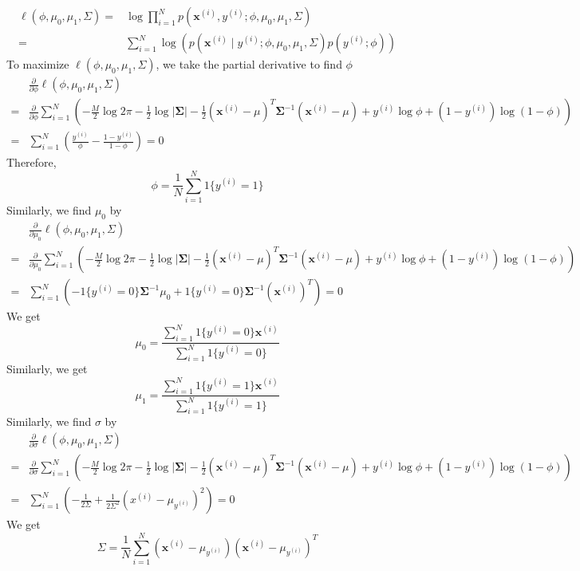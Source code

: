 \documentclass{article}
\begin{document}
$$
\begin{aligned}
\ell(\phi, \mu_{0}, \mu_{1}, \Sigma) 
= & \log \prod_{i=1}^{N} p(\mathbf{x}^{(i)}, y^{(i)} ; \phi, \mu_{0}, \mu_{1}, \Sigma) \\
= & \sum_{i=1}^{N} \log (p(\mathbf{x}^{(i)} \mid y^{(i)} ; \phi, \mu_{0}, \mu_{1}, \Sigma) p(y^{(i)} ; \phi))
\end{aligned}
$$
To maximize $\ell(\phi, \mu_{0}, \mu_{1}, \Sigma)$, we take the partial derivative to find $\phi$
$$
\begin{aligned}
& \frac{\partial}{\partial \phi} \ell(\phi, \mu_{0}, \mu_{1}, \Sigma) \\
=& \frac{\partial}{\partial \phi} \sum_{i=1}^{N}(-\frac{M}{2} \log 2 \pi-\frac{1}{2} \log |\boldsymbol{\Sigma}|-\frac{1}{2}(\mathbf{x}^{(i)}-\mu)^{T} \mathbf{\Sigma}^{-1}(\mathbf{x}^{(i)}-\mu)+y^{(i)} \log \phi+(1-y^{(i)}) \log (1-\phi)) \\
=& \sum_{i=1}^{N}(\frac{y^{(i)}}{\phi}-\frac{1-y^{(i)}}{1-\phi})=0
\end{aligned}
$$
Therefore,
$$
\phi = \frac{1}{N} \sum_{i=1}^{N} 1\{y^{(i)} = 1\}
$$
Similarly, we find $\mu_0$ by 
$$
\begin{aligned}
& \frac{\partial}{\partial \mu_{0}} \ell(\phi, \mu_{0}, \mu_{1}, \Sigma) \\
=& \frac{\partial}{\partial \mu_{0}} \sum_{i=1}^{N}(-\frac{M}{2} \log 2 \pi-\frac{1}{2} \log |\boldsymbol{\Sigma}|-\frac{1}{2}(\mathbf{x}^{(i)}-\mu)^{T} \mathbf{\Sigma}^{-1}(\mathbf{x}^{(i)}-\mu)+y^{(i)} \log \phi+(1-y^{(i)}) \log (1-\phi)) \\
=& \sum_{i=1}^{N}(-1\{y^{(i)}=0\} \boldsymbol{\Sigma}^{-1} \mu_{0}+1\{y^{(i)}=0\}\mathbf{\Sigma}^{-1}(\mathbf{x}^{(i)})^{T} )=0
\end{aligned}
$$
We get
$$
\mu_{0}=\frac{\sum_{i=1}^{N} 1\{y^{(i)}=0\} \mathbf{x}^{(i)}}{\sum_{i=1}^{N} 1\{y^{(i)}=0\}} 
$$
Similarly, we get
$$
\mu_{1}=\frac{\sum_{i=1}^{N} 1\{y^{(i)}=1\} \mathbf{x}^{(i)}}{\sum_{i=1}^{N} 1\{y^{(i)}=1\}}
$$
Similarly, we find $\sigma$ by
$$
\begin{aligned}
& \frac{\partial}{\partial \sigma} \ell(\phi, \mu_{0}, \mu_{1}, \Sigma) \\
=& \frac{\partial}{\partial \sigma} \sum_{i=1}^{N}(-\frac{M}{2} \log 2 \pi-\frac{1}{2} \log |\boldsymbol{\Sigma}|-\frac{1}{2}(\mathbf{x}^{(i)}-\mu)^{T} \mathbf{\Sigma}^{-1}(\mathbf{x}^{(i)}-\mu)+y^{(i)} \log \phi+(1-y^{(i)}) \log (1-\phi)) \\
= & \sum_{i=1}^{N}(-\frac{1}{2 \Sigma}+\frac{1}{2 \Sigma^{2}}(x^{(i)}-\mu_{y^{(i)}})^{2})=0
\end{aligned}
$$
We get
$$
\Sigma = \frac{1}{N} \sum_{i=1}^{N} (\mathbf{x}^{(i)} - \mu_{y^{(i)}})(\mathbf{x}^{(i)} - \mu_{y^{(i)}})^T
$$
\end{document}
